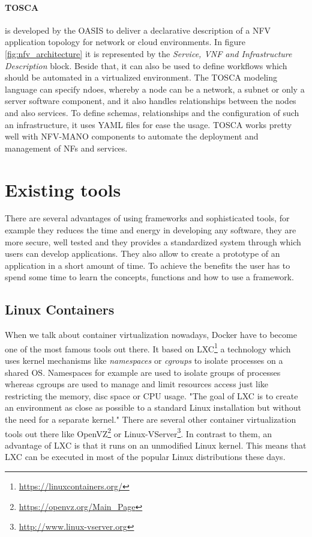\paragraph{\ac{TOSCA}} is developed by the \ac{OASIS} to deliver a declarative description of a \ac{NFV} application topology for network or cloud environments.\autocite[cf.]{Tosca:NFV}
In figure \ref{fig:nfv_architecture} it is represented by the \textit{Service, VNF and Infrastructure Description} block.
Beside that, it can also be used to define workflows which should be automated in a virtualized environment.\autocite[cf.]{Tosca:NFV}
The \ac{TOSCA} modeling language can specify ndoes, whereby a node can be a network, a subnet or only a server software component, and it also handles relationships between the nodes and also services.\autocite[cf.]{Tosca:NFV}
To define schemas, relationships and the configuration of such an infrastructure, it uses \ac{YAML} files for ease the usage.\autocite[cf.]{Tosca:NFV}
\ac{TOSCA} works pretty well with \ac{NFV-MANO} components to automate the deployment and management of \acp{NF} and services.


\section{Existing tools}

There are several advantages of using frameworks and sophisticated tools, for example they reduces the time and energy in developing any software, they are more secure, well tested and they provides a standardized system through which users can develop applications.
They also allow to create a prototype of an application in a short amount of time.
To achieve the benefits the user has to spend some time to learn the concepts, functions and how to use a framework.

\subsection{Linux Containers}
When we talk about container virtualization nowadays, Docker have to become one of the most famous tools out there.
It based on \ac{LXC}\footnote{\url{https://linuxcontainers.org/}} a technology which uses kernel mechanisms like \textit{namespaces} or \textit{cgroups} to isolate processes on a shared \ac{OS}.\autocite[cf.][p. 381]{Pahl:2015}
Namespaces for example are used to isolate groups of processes whereas cgroups are used to manage and limit resources access just like restricting the memory, disc space or \ac{CPU} usage.\autocite[cf.][p. 381]{Pahl:2015}
"The goal of \ac{LXC} is to create an environment as close as possible to a standard Linux installation but without the need for a separate kernel."\autocite[p. 72]{Tosatto:2015}
There are several other container virtualization tools out there like OpenVZ\footnote{\url{https://openvz.org/Main_Page}} or Linux-VServer\footnote{\url{http://www.linux-vserver.org}}.
In contrast to them, an advantage of \ac{LXC} is that it runs on an unmodified Linux kernel.
This means that \ac{LXC} can be executed in most of the popular Linux distributions these days.

